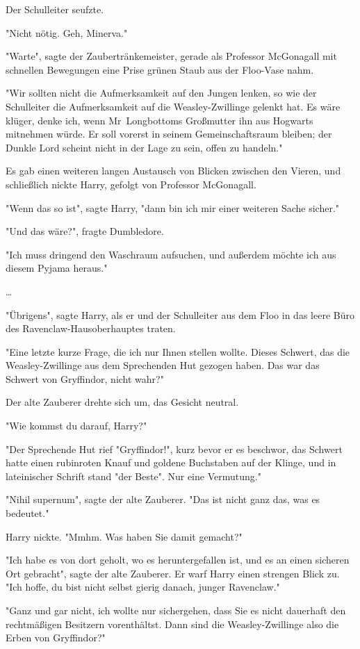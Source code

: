 {Der Schulleiter seufzte.

"Nicht nötig. Geh, Minerva."

"Warte", sagte der Zaubertränkemeister, gerade als Professor McGonagall mit schnellen Bewegungen eine Prise grünen Staub aus der Floo-Vase nahm.

"Wir sollten nicht die Aufmerksamkeit auf den Jungen lenken, so wie der Schulleiter die Aufmerksamkeit auf die Weasley-Zwillinge gelenkt hat. Es wäre klüger, denke ich, wenn Mr~Longbottoms Großmutter ihn aus Hogwarts mitnehmen würde. Er soll vorerst in seinem Gemeinschaftsraum bleiben; der Dunkle Lord scheint nicht in der Lage zu sein, offen zu handeln."

Es gab einen weiteren langen Austausch von Blicken zwischen den Vieren, und schließlich nickte Harry, gefolgt von Professor McGonagall.

"Wenn das so ist", sagte Harry, "dann bin ich mir einer weiteren Sache sicher."

"Und das wäre?", fragte Dumbledore.

"Ich muss dringend den Waschraum aufsuchen, und außerdem möchte ich aus diesem Pyjama heraus."

…

"Übrigens", sagte Harry, als er und der Schulleiter aus dem Floo in das leere Büro des Ravenclaw-Hausoberhauptes traten.

"Eine letzte kurze Frage, die ich nur Ihnen stellen wollte. Dieses Schwert, das die Weasley-Zwillinge aus dem Sprechenden Hut gezogen haben. Das war das Schwert von Gryffindor, nicht wahr?"

Der alte Zauberer drehte sich um, das Gesicht neutral.

"Wie kommst du darauf, Harry?"

"Der Sprechende Hut rief "Gryffindor!", kurz bevor er es beschwor, das Schwert hatte einen rubinroten Knauf und goldene Buchstaben auf der Klinge, und in lateinischer Schrift stand "der Beste". Nur eine Vermutung."

"Nihil supernum", sagte der alte Zauberer. "Das ist nicht ganz das, was es bedeutet."

Harry nickte. "Mmhm. Was haben Sie damit gemacht?"

"Ich habe es von dort geholt, wo es heruntergefallen ist, und es an einen sicheren Ort gebracht", sagte der alte Zauberer. Er warf Harry einen strengen Blick zu. "Ich hoffe, du bist nicht selbst gierig danach, junger Ravenclaw."

"Ganz und gar nicht, ich wollte nur sichergehen, dass Sie es nicht dauerhaft den rechtmäßigen Besitzern vorenthältst. Dann sind die Weasley-Zwillinge also die Erben von Gryffindor?"

}
